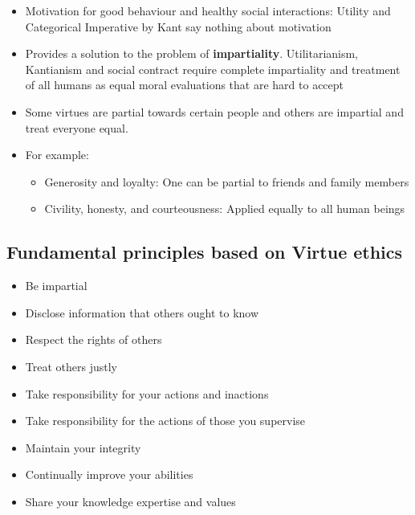 \documentclass{article}
\begin{document}
\begin{flushleft}
\begin{itemize}
  \item Motivation for good behaviour and healthy social interactions: Utility and Categorical Imperative by Kant say nothing about motivation
  \item Provides a solution to the problem of \textbf{impartiality}. Utilitarianism, Kantianism and social contract require complete impartiality and treatment of all humans as equal moral evaluations that are hard to accept
  \item Some virtues are partial towards certain people and others are impartial and treat everyone equal.
  \item For example:
  \begin{itemize}
    \item Generosity and loyalty: One can be partial to friends and family members
    \item Civility, honesty, and courteousness: Applied equally to all human beings
  \end{itemize}
\end{itemize}
\end{flushleft}

\subsection{Fundamental principles based on Virtue ethics}
\begin{itemize}
  \item Be impartial
  \item Disclose information that others ought to know 
  \item Respect the rights of others
  \item Treat others justly
  \item Take responsibility for your actions and inactions
  \item Take responsibility for the actions of those you supervise
  \item Maintain your integrity
  \item Continually improve your abilities
  \item Share your knowledge expertise and values
\end{itemize}
\end{document}
